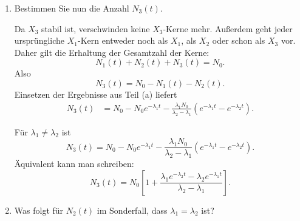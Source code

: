 \documentclass[11pt,a4paper]{scrartcl}
\begin{document}
\begin{enumerate}[label=(\alph*)]
        \item
            Bestimmen Sie nun die Anzahl $N_3(t)$.

            \begin{calculationbox}
                Da $X_3$ stabil ist, verschwinden keine $X_3$-Kerne mehr.
                Außerdem geht jeder ursprüngliche $X_1$-Kern entweder noch als $X_1$, als $X_2$ oder schon als $X_3$ vor.
                Daher gilt die Erhaltung der Gesamtzahl der Kerne:
                \[
                    N_1(t)+N_2(t)+N_3(t)=N_0.
                \]
                Also
                \[
                    N_3(t)=N_0-N_1(t)-N_2(t).
                \]
                Einsetzen der Ergebnisse aus Teil (a) liefert
                \begin{align*}
                    N_3(t)
                    &=N_0-N_0e^{-\lambda_1t}
                    -\frac{\lambda_1N_0}{\lambda_2-\lambda_1}
                    \left(e^{-\lambda_1t}-e^{-\lambda_2t}\right).
                \end{align*}
            \end{calculationbox}

            \begin{answerbox}
                Für $\lambda_1\neq\lambda_2$ ist
                \[
                    \boxed{
                    N_3(t)=N_0-N_0e^{-\lambda_1t}
                    -\frac{\lambda_1N_0}{\lambda_2-\lambda_1}
                    \left(e^{-\lambda_1t}-e^{-\lambda_2t}\right).
                    }
                \]
                Äquivalent kann man schreiben:
                \[
                    \boxed{
                    N_3(t)=N_0\left[1+
                    \frac{\lambda_1e^{-\lambda_2t}-\lambda_2e^{-\lambda_1t}}
                    {\lambda_2-\lambda_1}
                    \right].
                    }
                \]
            \end{answerbox}

        \item
            Was folgt für $N_2(t)$ im Sonderfall, dass $\lambda_1=\lambda_2$ ist?


\end{enumerate}
\end{document}
